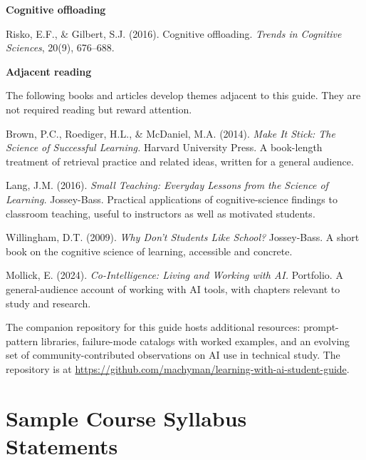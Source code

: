 \documentclass[11pt]{book}
\begin{document}
\medskip

\noindent \textbf{Cognitive offloading}

\medskip

Risko, E.F., \& Gilbert, S.J. (2016). Cognitive offloading. \emph{Trends in Cognitive Sciences}, 20(9), 676--688.

\medskip\medskip

\noindent \textbf{Adjacent reading}

\medskip

The following books and articles develop themes adjacent to this guide. They are not required reading but reward attention.

\medskip

Brown, P.C., Roediger, H.L., \& McDaniel, M.A. (2014). \emph{Make It Stick: The Science of Successful Learning.} Harvard University Press. A book-length treatment of retrieval practice and related ideas, written for a general audience.

\medskip

Lang, J.M. (2016). \emph{Small Teaching: Everyday Lessons from the Science of Learning.} Jossey-Bass. Practical applications of cognitive-science findings to classroom teaching, useful to instructors as well as motivated students.

\medskip

Willingham, D.T. (2009). \emph{Why Don't Students Like School?} Jossey-Bass. A short book on the cognitive science of learning, accessible and concrete.

\medskip

Mollick, E. (2024). \emph{Co-Intelligence: Living and Working with AI.} Portfolio. A general-audience account of working with AI tools, with chapters relevant to study and research.

\medskip\medskip

\noindent The companion repository for this guide hosts additional resources: prompt-pattern libraries, failure-mode catalogs with worked examples, and an evolving set of community-contributed observations on AI use in technical study. The repository is at \url{https://github.com/machyman/learning-with-ai-student-guide}.

\chapter{Sample Course Syllabus Statements}
\label{app:syllabus-statements}
\end{document}
